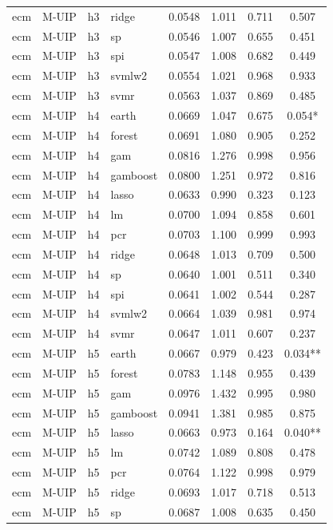 \begin{ThreePartTable}
\begin{longtable}[t]{llclcccc}
ecm & M-UIP & h3 & ridge & 0.0548 & 1.011 & 0.711 & 0.507\\
ecm & M-UIP & h3 & sp & 0.0546 & 1.007 & 0.655 & 0.451\\
ecm & M-UIP & h3 & spi & 0.0547 & 1.008 & 0.682 & 0.449\\
ecm & M-UIP & h3 & svmlw2 & 0.0554 & 1.021 & 0.968 & 0.933\\
ecm & M-UIP & h3 & svmr & 0.0563 & 1.037 & 0.869 & 0.485\\
\addlinespace
ecm & M-UIP & h4 & earth & 0.0669 & 1.047 & 0.675 & 0.054*\\
ecm & M-UIP & h4 & forest & 0.0691 & 1.080 & 0.905 & 0.252\\
ecm & M-UIP & h4 & gam & 0.0816 & 1.276 & 0.998 & 0.956\\
ecm & M-UIP & h4 & gamboost & 0.0800 & 1.251 & 0.972 & 0.816\\
ecm & M-UIP & h4 & lasso & 0.0633 & 0.990 & 0.323 & 0.123\\
ecm & M-UIP & h4 & lm & 0.0700 & 1.094 & 0.858 & 0.601\\
ecm & M-UIP & h4 & pcr & 0.0703 & 1.100 & 0.999 & 0.993\\
ecm & M-UIP & h4 & ridge & 0.0648 & 1.013 & 0.709 & 0.500\\
ecm & M-UIP & h4 & sp & 0.0640 & 1.001 & 0.511 & 0.340\\
ecm & M-UIP & h4 & spi & 0.0641 & 1.002 & 0.544 & 0.287\\
ecm & M-UIP & h4 & svmlw2 & 0.0664 & 1.039 & 0.981 & 0.974\\
ecm & M-UIP & h4 & svmr & 0.0647 & 1.011 & 0.607 & 0.237\\
\addlinespace
ecm & M-UIP & h5 & earth & 0.0667 & 0.979 & 0.423 & 0.034**\\
ecm & M-UIP & h5 & forest & 0.0783 & 1.148 & 0.955 & 0.439\\
ecm & M-UIP & h5 & gam & 0.0976 & 1.432 & 0.995 & 0.980\\
ecm & M-UIP & h5 & gamboost & 0.0941 & 1.381 & 0.985 & 0.875\\
ecm & M-UIP & h5 & lasso & 0.0663 & 0.973 & 0.164 & 0.040**\\
ecm & M-UIP & h5 & lm & 0.0742 & 1.089 & 0.808 & 0.478\\
ecm & M-UIP & h5 & pcr & 0.0764 & 1.122 & 0.998 & 0.979\\
ecm & M-UIP & h5 & ridge & 0.0693 & 1.017 & 0.718 & 0.513\\
ecm & M-UIP & h5 & sp & 0.0687 & 1.008 & 0.635 & 0.450\\

\end{longtable}
\end{ThreePartTable}
